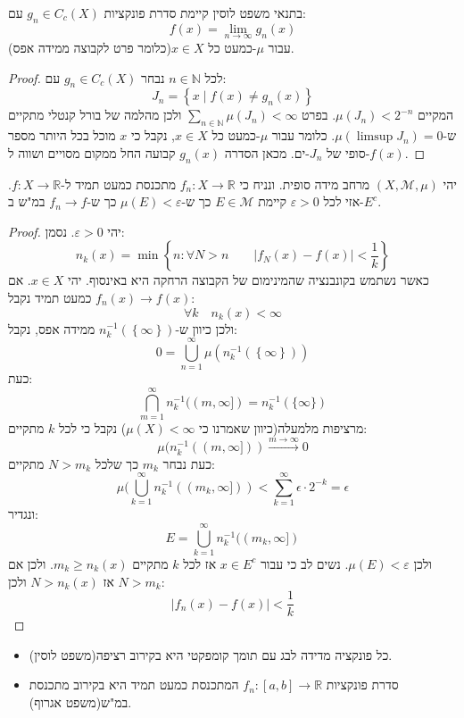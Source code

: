 \documentclass{tstextbook}
\begin{document}
\begin{corollary}
בתנאי משפט לוסין קיימת סדרת פונקציות \(g_{n}\in C_{c}(X)\) עם:
$$f(x)=\lim_{ n \to \infty } g_{n}(x)$$
עבור \(\mu\)-כמעט כל \(x \in X\)(כלומר פרט לקבוצה ממידה אפס).

\end{corollary}
\begin{proof}
לכל \(n \in \mathbb{N}\) נבחר \(g_{n}\in C_{c}(X)\) עם:
$$J_{n}=\left\{  x\mid f(x)\neq g_{n}(x)  \right\}$$
המקיים \(\mu(J_{n})<2^{-n}\). בפרט \(\sum_{n \in \mathbb{N}} \mu(J_{n})< \infty\) ולכן מהלמה של בורל קנטלי מתקיים ש-\(\mu(\limsup J_{n})=0\). כלומר עבור \(\mu\)-כמעט כל \(x \in X\), נקבל כי \(x\) מוכל בכל היותר מספר סופי של \(J_{n}\)-ים. מכאן הסדרה \(g_{n}(x)\) קבועה החל ממקום מסויים ושווה ל-\(f(x)\).

\end{proof}
\begin{theorem}[אגורוף]
יהי \(\left( X,\mathcal{M},\mu \right)\) מרחב מידה סופית. ונניח כי \(f_{n}:X\to \mathbb{R}\) מתכנסת כמעט תמיד ל-\(f:X\to \mathbb{R}\). אזי לכל \(\varepsilon> 0\) קיימת \(E \in \mathcal{ M}\) כך ש-\(\mu(E)< \varepsilon\) כך ש-\(f_{n}\to f\) במ"ש ב-\(E^{c}\).

\end{theorem}
\begin{proof}
יהי \(\varepsilon> 0\). נסמן:
$$n_{k}(x)=\operatorname*{min}\left\{n:\forall N>n\qquad|f_{N}(x)-f(x)|<{\frac{1}{k}}\right\}$$
כאשר נשתמש בקונבנציה שהמינימום של הקבוצה הרחקה היא באינסוף. יהי \(x \in X\). אם \(f_{n}(x)\to f(x)\) כמעט תמיד נקבל:
$$\forall k\quad n_{k}(x)<\infty$$
ולכן כיוון ש-\(n^{-1}_{k}\left( \left\{  \infty  \right\} \right)\) ממידה אפס, נקבל:
$$0=\bigcup_{n=1}^{\infty}\mu\left( n_{k}^{-1}\left( \left\{  \infty  \right\} \right) \right)$$
כעת:
$$\bigcap_{m=1}^{\infty}n_{k}^{-1}((m,\infty])=n_{k}^{-1}(\{\infty\})$$
מרציפות מלמעלה(כיוון שאמרנו כי \(\mu(X)<\infty\)) נקבל כי לכל \(k\) מתקיים:
$$\mu(n_{k}^{-1}\left( \left( m,\infty] \right) \right)\xrightarrow{m\to \infty}0$$
כעת נבחר \(m_{k}\) כך שלכל \(N> m_{k}\) מתקיים:
$$\mu(\bigcup_{k=1}^{\infty}n_{k}^{-1}((m_{k},\infty]))<\sum_{k=1}^{\infty}\epsilon\cdot2^{-k}=\epsilon$$
ונגדיר:
$$E=\bigcup_{k=1}^{\infty}n_{k}^{-1}((m_{k},\infty])$$
ולכן \(\mu(E)<\varepsilon\). נשים לב כי עבור \(x \in E^{c}\) אז לכל \(k\) מתקיים \(m_{k}\geq n_{k}(x)\). ולכן אם \(N>m_{k}\) אז \(N> n_{k}(x)\) ולכן:
$$\lvert f_{n}(x)-f(x) \rvert < \frac{1}{k}$$

\end{proof}
\begin{summary}
  \begin{itemize}
    \item כל פונקציה מדידה לבג עם תומך קומפקטי היא בקירוב רציפה(משפט לוסין).
    \item סדרת פונקציות \(f_{n}:[a,b]\to \mathbb{R}\) המתכנסת כמעט תמיד היא בקירוב מתכנסת במ"ש(משפט אגרוף).
  \end{itemize}
\end{summary}
\end{document}
